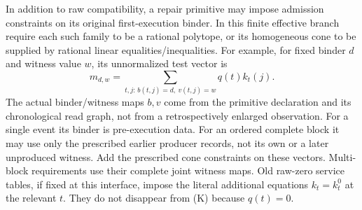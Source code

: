 \documentclass[11pt]{article}
\begin{document}
In addition to raw compatibility, a repair primitive may impose admission constraints on its original first-execution binder. In this finite effective branch require each such family to be a rational polytope, or its homogeneous cone to be supplied by rational linear equalities/inequalities. For example, for fixed binder $d$ and witness value $w$, its unnormalized test vector is
\[
 m_{d,w}=\sum_{t,j:\,b(t,j)=d,\ v(t,j)=w}q(t)k_t(j).
\tag{A}
\]
The actual binder/witness maps $b,v$ come from the primitive declaration and its chronological read graph, not from a retrospectively enlarged observation. For a single event its binder is pre-execution data. For an ordered complete block it may use only the prescribed earlier producer records, not its own or a later unproduced witness. Add the prescribed cone constraints on these vectors. Multi-block requirements use their complete joint witness maps. Old raw-zero service tables, if fixed at this interface, impose the literal additional equations $k_t=k_t^0$ at the relevant $t$. They do not disappear from (K) because $q(t)=0$.
\end{document}
